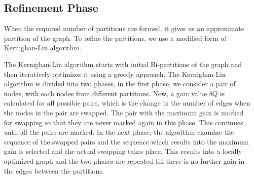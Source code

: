 \documentclass[letterpaper]{article}
\begin{document}
 
\subsection{Refinement Phase}
When the required number of partitions are formed, it gives us an approximate
partition of the graph. To refine the partitions, we use a modified form of
Kernighan-Lin algorithm\cite{22}.


    The Kernighan-Lin algorithm starts with initial Bi-partitions of the graph
and then iteratively optimizes it using a greedy approach. The Kernighan-Lin
algorithm is divided into two phases, in the first phase, we consider a pair of
nodes, with each nodes from different partitions. Now, a gain value $\delta$$Q$
is calculated for all possible pairs, which is the change in the number of
edges when the nodes in the pair are swapped. The pair with the maximum  gain
is marked for swapping so that they are never marked again in this phase. This
continues until all the pairs are marked. In the next phase, the algorithm
examine the sequence of the swapped pairs and the sequence which results into
the maximum gain is selected and the actual swapping takes place. This results
into a locally optimized graph and the two phases are repeated till there is no
further gain in the edges between the partitions.
\end{document}
